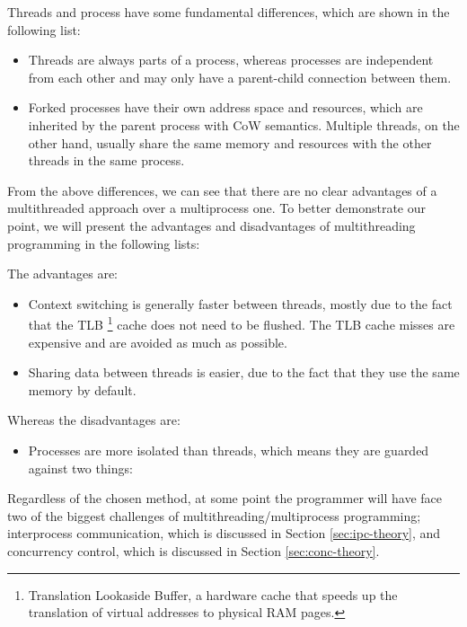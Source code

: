 Threads and process have some fundamental differences, which are shown in the 
following list:

\begin{itemize}
	\item Threads are always parts of a process, whereas processes are 
		independent from each other and may only have a parent-child connection 
		between them.
	\item Forked processes have their own address space and resources, which 
		are inherited by the parent process with CoW semantics.  Multiple 
		threads, on the other hand, usually share the same memory and resources 
		with the other threads in the same process.
\end{itemize}

From the above differences, we can see that there are no clear advantages of a 
multithreaded approach over a multiprocess one. To better demonstrate our 
point, we will present the advantages and disadvantages of multithreading 
programming in the following lists:

The advantages are:

\begin{itemize}
	\item Context switching is generally faster between threads, mostly due 
		to the fact that the TLB
		\footnote{Translation Lookaside Buffer, a hardware cache that speeds up 
			the translation of virtual addresses to physical RAΜ pages.}
		cache does not need to be flushed. The TLB cache misses are 
		expensive and are avoided as much as possible\cite{tlb}.
	\item Sharing data between threads is easier, due to the fact that they 
		use the same memory by default.
\end{itemize}

Whereas the disadvantages are:

\begin{itemize}
	\item Processes are more isolated than threads, which means they are 
		guarded against two things:
\end{itemize}

Regardless of the chosen method, at some point the programmer will have face 
two of the biggest challenges of multithreading/multiprocess programming;
interprocess communication, which is discussed in Section \ref{sec:ipc-theory}, 
and concurrency control, which is discussed in Section \ref{sec:conc-theory}.


